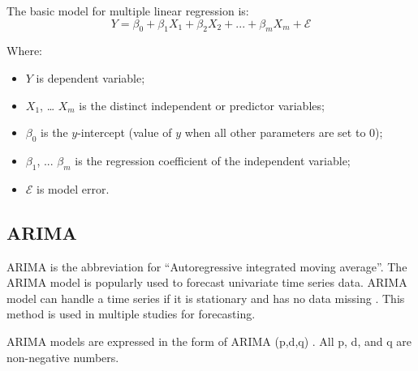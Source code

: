 \documentclass{ieeeojies}
\begin{document}
The basic model for multiple linear regression is:
\begin{equation}
    Y = \beta_0 + \beta_1X_1 + \beta_2X_2 + ... + \beta_mX_m + \mathcal{E}
\end{equation}

Where:
\begin{itemize}
    \item $Y$ is dependent variable;
    \item $X_1$, … $X_m$ is the distinct independent or predictor variables;
    \item $\beta_0$ is the $y$-intercept (value of $y$ when all other parameters are set to 0);
    \item $\beta_1$, ... $\beta_m$ is the regression coefficient of the independent variable;
    \item $\mathcal{E}$ is model error.
\end{itemize}


\subsection{ARIMA}
ARIMA is the abbreviation for “Autoregressive integrated moving average”. The ARIMA model is popularly used to forecast univariate time series data. ARIMA model can handle a time series if it is stationary and has no data missing \cite{b6}. This method is used in multiple studies for forecasting.

ARIMA models are expressed in the form of ARIMA (p,d,q) \cite{b7}. All p, d, and q are non-negative numbers.
\end{document}
